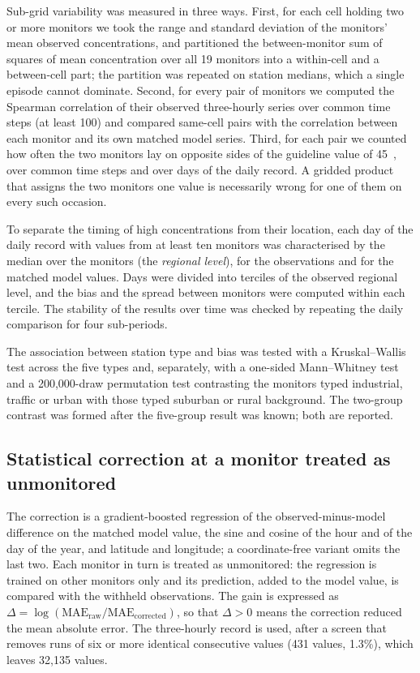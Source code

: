 Sub-grid variability was measured in three ways. First, for each cell holding two or more
monitors we took the range and standard deviation of the monitors' mean observed concentrations,
and partitioned the between-monitor sum of squares of mean concentration over all 19 monitors
into a within-cell and a between-cell part; the partition was repeated on station medians, which
a single episode cannot dominate. Second, for every pair of monitors we computed the Spearman correlation \citep{spearman1904} of their observed three-hourly series over common time steps (at least 100) and
compared same-cell pairs with the correlation between each monitor and its own matched model
series. Third, for each pair we counted how often the two monitors lay on opposite sides of the
guideline value of 45~\ugm{}, over common time steps and over days of the daily record. A gridded
product that assigns the two monitors one value is necessarily wrong for one of them on every such
occasion.

To separate the timing of high concentrations from their location, each day of the daily record
with values from at least ten monitors was characterised by the median over the monitors (the
\emph{regional level}), for the observations and for the matched model values. Days were divided
into terciles of the observed regional level, and the bias and the spread between monitors were
computed within each tercile. The stability of the results over time was checked by repeating
the daily comparison for four sub-periods.

The association between station type and bias was tested with a Kruskal--Wallis test across the
five types \citep{kruskal1952} and, separately, with a one-sided Mann--Whitney test
\citep{mann1947} and a 200,000-draw permutation
test contrasting the monitors typed industrial, traffic or urban with those typed suburban or
rural background. The two-group contrast was formed after the five-group result was known; both
are reported.

\subsection{Statistical correction at a monitor treated as unmonitored}
\label{sec:methods-transfer}

The correction is a gradient-boosted regression \citep{friedman2001,pedregosa2011} of the
observed-minus-model difference on the matched model value, the sine and cosine of the hour and
of the day of the year, and latitude and longitude; a coordinate-free variant omits the last two.
Each monitor in turn is treated as unmonitored: the regression is trained on other monitors only
and its prediction, added to the model value, is compared with the withheld observations. The
gain is expressed as $\Delta=\log(\mathrm{MAE_{raw}}/\mathrm{MAE_{corrected}})$, so that
$\Delta>0$ means the correction reduced the mean absolute error. The three-hourly record is used,
after a screen that removes runs of six or more identical consecutive values (431 values, 1.3\%),
which leaves 32,135 values.

